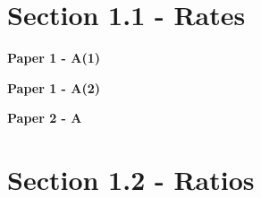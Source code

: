 \documentclass[12pt, a4paper]{article}
\begin{document}
\section*{Section 1.1 - Rates}\label{section:2-1-1}

\textbf{Paper 1 - A(1)}
\begin{enumx}[label=\arabic*.,start=1]
\item {}\label{DSE2018-CoreP1-Q09} 
\end{enumx}
\textbf{Paper 1 - A(2)}
\begin{enumx}[label=\arabic*.,start=2]
\item {}\label{DSE2012S-CoreP1-Q12} 
\item {}\label{DSE2012P-CoreP1-Q12} 
\item {}\label{DSE2014-CoreP1-Q10} 
\end{enumx}
\textbf{Paper 2 - A}
\begin{enumx}[label=\arabic*.,start=5]
\item {}\label{DSE2012-CoreP2-Q11} 
\item {}\label{DSE2016-CoreP2-Q13} 
\item {}\label{DSE2024-CoreP2-Q12} 
\end{enumx}




\section*{Section 1.2 - Ratios}\label{section:2-1-2}
\end{document}

